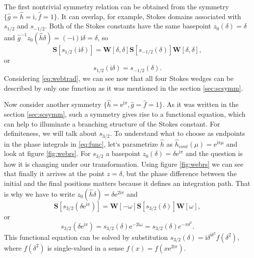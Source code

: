 \documentclass[atmp]{ipart_v1}
\def\rme{\mathrm{e}}
\def\rmi{\mathrm{i}}
\def\f{\hat{f}}
\def\g{\hat{g}}
\def\h{\hat{h}}
\def\S{\bm{S}}
\def\W{\bm{W}}
\def\unity{1}
\def\w{\omega}
\newcommand\eref[1]{\eqref{#1}}
\newcommand\fref[1]{figure \ref{#1}}
\newcommand\sref[1]{section \ref{#1}}
\begin{document}
The first nontrivial symmetry relation can be obtained from the symmetry 
$\{\g=\h=\rmi,\f=\unity\}$. It can overlap, for example, Stokes domains associated with
$s_{1/2}$ and $s_{-1/2}$. Both of the Stokes constants have the same 
basepoint $z_0(\delta)=\delta$ and $\g^{-1}z_0(\h\delta)=(-\rmi)\rmi\delta=\delta$, so
\begin{equation}
\S \left[ s_{1/2}(\rmi \delta) \right] = 
\W \left[ \delta, \delta \right]
\S \left[ s_{-1/2}(\delta) \right]
\W \left[ \delta, \delta \right],
\end{equation}
or
\begin{equation}
s_{1/2}(\rmi \delta) = s_{-1/2}(\delta).
\label{eq:websym_1}
\end{equation}
Considering \eref{eq:webtrad}, we can 
see now that all four Stokes wedges can be described by only one function as it
was mentioned in the \sref{sec:scsymm}. 

Now consider another symmetry $\{\h=\rme^{\rmi\pi},\g=\f=\unity\}$. 
As it was written in the \sref{sec:scsymm}, such a symmetry gives rise to a functional 
equation, which can help to illuminate a branching structure of the Stokes constant. 
For definiteness, we will talk about $s_{3/2}$. To understand what to choose as endpoints 
in the phase integrals in \eref{eq:func}, let`s parametrize $\h$ as $\h_{cont}(\mu)=\rme^{\rmi\pi\mu}$ 
and look at \fref{fig:webrs}. For $s_{3/2}$ a basepoint $z_0(\delta)=\delta \rme^{\rmi\pi}$ 
and the question is how it is changing under our transformation. Using \fref{fig:webrs} 
we can see that finally it arrives at the point $z=\delta$, but the phase difference between the
initial and the final positions matters because it defines an integration path.
That is why we have to write $z_0(\h\delta)=\delta \rme^{2\rmi\pi}$ and
\begin{equation}
\S \left[ s_{3/2}(\delta \rme^{\rmi\pi}) \right] = 
\W \left[- \w \right]
\S \left[ s_{3/2} (\delta) \right]
\W \left[  \w \right],
\end{equation}
or
\begin{equation}
s_{3/2}(\delta \rme^{\rmi\pi})=s_{3/2}(\delta)\rme^{-2\rmi \w}=s_{3/2}(\delta)e^{-\pi\delta^2}.
\label{eq:websym_2}
\end{equation}
This functional equation can be solved by substitution 
$s_{3/2}(\delta)=\rmi\delta^{\rmi\delta^2}f(\delta^2)$, where $f(\delta^2)$
is single-valued in a sense $f(x)=f(x \rme^{2\rmi\pi})$.
\end{document}
